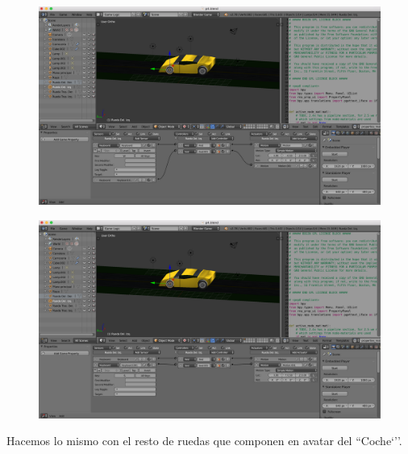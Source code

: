 \documentclass[10pt]{article}
\begin{document}
\begin{figure}[H]
	\begin{center}
	 		\includegraphics[width = 1.00\textwidth]{Imagenes/p4-img5}
	\end{center} 
\end{figure}

\begin{figure}[H]
	\begin{center}
	 		\includegraphics[width = 1.00\textwidth]{Imagenes/p4-img6}
	\end{center} 
\end{figure}
 
Hacemos lo mismo con el resto de ruedas que componen en avatar del ``Coche`''. \\
\end{document}
